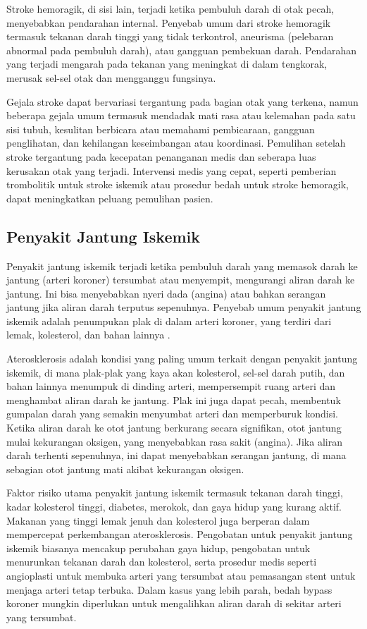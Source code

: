 Stroke hemoragik, di sisi lain, terjadi ketika pembuluh darah di otak pecah, menyebabkan pendarahan internal. Penyebab umum dari stroke hemoragik termasuk tekanan darah tinggi yang tidak terkontrol, aneurisma (pelebaran abnormal pada pembuluh darah), atau gangguan pembekuan darah. Pendarahan yang terjadi mengarah pada tekanan yang meningkat di dalam tengkorak, merusak sel-sel otak dan mengganggu fungsinya.

Gejala stroke dapat bervariasi tergantung pada bagian otak yang terkena, namun beberapa gejala umum termasuk mendadak mati rasa atau kelemahan pada satu sisi tubuh, kesulitan berbicara atau memahami pembicaraan, gangguan penglihatan, dan kehilangan keseimbangan atau koordinasi. Pemulihan setelah stroke tergantung pada kecepatan penanganan medis dan seberapa luas kerusakan otak yang terjadi. Intervensi medis yang cepat, seperti pemberian trombolitik untuk stroke iskemik atau prosedur bedah untuk stroke hemoragik, dapat meningkatkan peluang pemulihan pasien.

\subsection{Penyakit Jantung Iskemik}
\label{subsubsec:jantungiskemik}

Penyakit jantung iskemik terjadi ketika pembuluh darah yang memasok darah ke jantung (arteri koroner) tersumbat atau menyempit, mengurangi aliran darah ke jantung. Ini bisa menyebabkan nyeri dada (angina) atau bahkan serangan jantung jika aliran darah terputus sepenuhnya. Penyebab umum penyakit jantung iskemik adalah penumpukan plak di dalam arteri koroner, yang terdiri dari lemak, kolesterol, dan bahan lainnya \cite{kkr2024jantungiskemik}.

Aterosklerosis adalah kondisi yang paling umum terkait dengan penyakit jantung iskemik, di mana plak-plak yang kaya akan kolesterol, sel-sel darah putih, dan bahan lainnya menumpuk di dinding arteri, mempersempit ruang arteri dan menghambat aliran darah ke jantung. Plak ini juga dapat pecah, membentuk gumpalan darah yang semakin menyumbat arteri dan memperburuk kondisi. Ketika aliran darah ke otot jantung berkurang secara signifikan, otot jantung mulai kekurangan oksigen, yang menyebabkan rasa sakit (angina). Jika aliran darah terhenti sepenuhnya, ini dapat menyebabkan serangan jantung, di mana sebagian otot jantung mati akibat kekurangan oksigen.

Faktor risiko utama penyakit jantung iskemik termasuk tekanan darah tinggi, kadar kolesterol tinggi, diabetes, merokok, dan gaya hidup yang kurang aktif. Makanan yang tinggi lemak jenuh dan kolesterol juga berperan dalam mempercepat perkembangan aterosklerosis. Pengobatan untuk penyakit jantung iskemik biasanya mencakup perubahan gaya hidup, pengobatan untuk menurunkan tekanan darah dan kolesterol, serta prosedur medis seperti angioplasti untuk membuka arteri yang tersumbat atau pemasangan stent untuk menjaga arteri tetap terbuka. Dalam kasus yang lebih parah, bedah bypass koroner mungkin diperlukan untuk mengalihkan aliran darah di sekitar arteri yang tersumbat.

